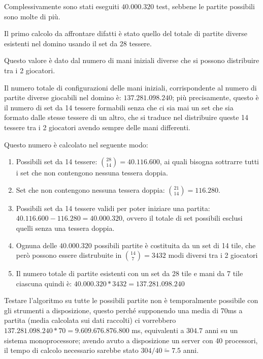 \documentclass[a4paper,12pt]{report}
\begin{document}
Complessivamente sono stati eseguiti \(40.000.320\) test, sebbene le partite possibili sono molte di più.

Il primo calcolo da affrontare difatti è stato quello del totale di partite diverse esistenti nel domino usando il set da 28 tessere.

Questo valore è dato dal numero di mani iniziali diverse che si possono distribuire tra i 2 giocatori.

Il numero totale di configurazioni delle mani iniziali, corrispondente al numero di partite diverse giocabili nel domino è: \(137.281.098.240\); più precisamente, questo è il numero di set da 14 tessere formabili senza che ci sia mai un set che sia formato dalle stesse tessere di un altro, che si traduce nel distribuire queste 14 tessere tra i 2 giocatori avendo sempre delle mani differenti.

Questo numero è calcolato nel seguente modo:

\begin{enumerate}
    \item Possibili set da 14 tessere: \(\binom{28}{14} = 40.116.600\), ai quali bisogna sottrarre tutti i set che non contengono nessuna tessera doppia.
    \item Set che non contengono nessuna tessera doppia: \(\binom{21}{14} = 116.280\).
    \item Possibili set da 14 tessere validi per poter iniziare una partita: \(40.116.600 - 116.280 = 40.000.320\), ovvero il totale di set possibili esclusi quelli senza una tessera doppia.
    \item Ognuna delle \(40.000.320\) possibili partite è costituita da un set di 14 tile, che però possono essere distrubuite in \(\binom{14}{7} = 3432\) modi diversi tra i 2 giocatori
    \item Il numero totale di partite esistenti con un set da 28 tile e mani da 7 tile ciascuna quindi è: \(40.000.320 * 3432 = 137.281.098.240\)
\end{enumerate}

Testare l'algoritmo su tutte le possibili partite non è temporalmente possibile con gli strumenti a disposizione, questo perché supponendo una media di 70ms a partita (media calcolata sui dati raccolti) ci vorrebbero \(137.281.098.240 * 70  = 9.609.676.876.800\) ms, equivalenti a \(304.7\) anni su un sistema monoprocessore; avendo avuto a disposizione un server con 40 processori, il tempo di calcolo necessario sarebbe stato \(304 / 40 \tilde= 7.5\) anni. 
\end{document}

